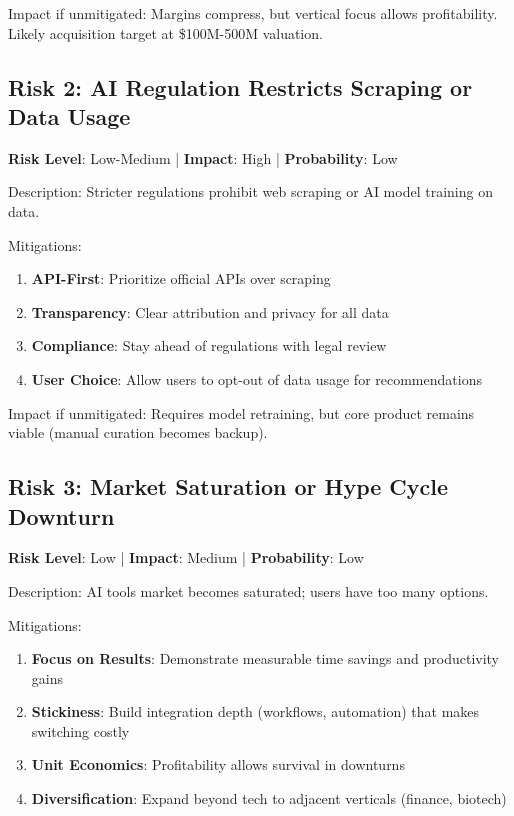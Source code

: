 \documentclass{report}
\begin{document}
Impact if unmitigated: Margins compress, but vertical focus allows profitability. Likely acquisition target at \$100M-500M valuation.

\subsection{Risk 2: AI Regulation Restricts Scraping or Data Usage}

\textbf{Risk Level}: Low-Medium | \textbf{Impact}: High | \textbf{Probability}: Low

Description: Stricter regulations prohibit web scraping or AI model training on data.

Mitigations:
\begin{enumerate}
    \item \textbf{API-First}: Prioritize official APIs over scraping
    \item \textbf{Transparency}: Clear attribution and privacy for all data
    \item \textbf{Compliance}: Stay ahead of regulations with legal review
    \item \textbf{User Choice}: Allow users to opt-out of data usage for recommendations
\end{enumerate}

Impact if unmitigated: Requires model retraining, but core product remains viable (manual curation becomes backup).

\subsection{Risk 3: Market Saturation or Hype Cycle Downturn}

\textbf{Risk Level}: Low | \textbf{Impact}: Medium | \textbf{Probability}: Low

Description: AI tools market becomes saturated; users have too many options.

Mitigations:
\begin{enumerate}
    \item \textbf{Focus on Results}: Demonstrate measurable time savings and productivity gains
    \item \textbf{Stickiness}: Build integration depth (workflows, automation) that makes switching costly
    \item \textbf{Unit Economics}: Profitability allows survival in downturns
    \item \textbf{Diversification}: Expand beyond tech to adjacent verticals (finance, biotech)
\end{enumerate}
\end{document}

